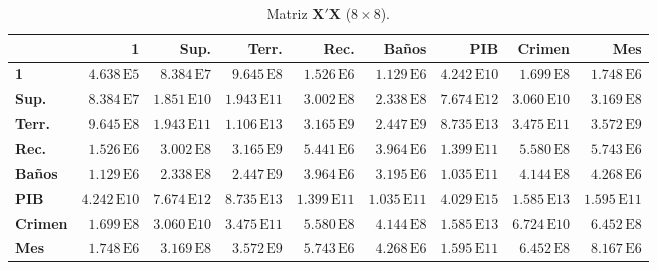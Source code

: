 \documentclass[12pt,letterpaper]{article}
\begin{document}
\begin{table}[H]
\centering
\caption{Matriz $\mathbf{X}'\mathbf{X}$ ($8 \times 8$).}
\scriptsize\setlength{\tabcolsep}{2.5pt}
\begin{tabular}{l*{8}{r}}
\toprule
 & 1 & Sup. & Terr. & Rec. & Baños & PIB & Crimen & Mes \\
\midrule
\textbf{1} & $4.638{\scriptstyle\,\mathrm{E}5}$ & $8.384{\scriptstyle\,\mathrm{E}7}$ & $9.645{\scriptstyle\,\mathrm{E}8}$ & $1.526{\scriptstyle\,\mathrm{E}6}$ & $1.129{\scriptstyle\,\mathrm{E}6}$ & $4.242{\scriptstyle\,\mathrm{E}10}$ & $1.699{\scriptstyle\,\mathrm{E}8}$ & $1.748{\scriptstyle\,\mathrm{E}6}$ \\
\textbf{Sup.} & $8.384{\scriptstyle\,\mathrm{E}7}$ & $1.851{\scriptstyle\,\mathrm{E}10}$ & $1.943{\scriptstyle\,\mathrm{E}11}$ & $3.002{\scriptstyle\,\mathrm{E}8}$ & $2.338{\scriptstyle\,\mathrm{E}8}$ & $7.674{\scriptstyle\,\mathrm{E}12}$ & $3.060{\scriptstyle\,\mathrm{E}10}$ & $3.169{\scriptstyle\,\mathrm{E}8}$ \\
\textbf{Terr.} & $9.645{\scriptstyle\,\mathrm{E}8}$ & $1.943{\scriptstyle\,\mathrm{E}11}$ & $1.106{\scriptstyle\,\mathrm{E}13}$ & $3.165{\scriptstyle\,\mathrm{E}9}$ & $2.447{\scriptstyle\,\mathrm{E}9}$ & $8.735{\scriptstyle\,\mathrm{E}13}$ & $3.475{\scriptstyle\,\mathrm{E}11}$ & $3.572{\scriptstyle\,\mathrm{E}9}$ \\
\textbf{Rec.} & $1.526{\scriptstyle\,\mathrm{E}6}$ & $3.002{\scriptstyle\,\mathrm{E}8}$ & $3.165{\scriptstyle\,\mathrm{E}9}$ & $5.441{\scriptstyle\,\mathrm{E}6}$ & $3.964{\scriptstyle\,\mathrm{E}6}$ & $1.399{\scriptstyle\,\mathrm{E}11}$ & $5.580{\scriptstyle\,\mathrm{E}8}$ & $5.743{\scriptstyle\,\mathrm{E}6}$ \\
\textbf{Baños} & $1.129{\scriptstyle\,\mathrm{E}6}$ & $2.338{\scriptstyle\,\mathrm{E}8}$ & $2.447{\scriptstyle\,\mathrm{E}9}$ & $3.964{\scriptstyle\,\mathrm{E}6}$ & $3.195{\scriptstyle\,\mathrm{E}6}$ & $1.035{\scriptstyle\,\mathrm{E}11}$ & $4.144{\scriptstyle\,\mathrm{E}8}$ & $4.268{\scriptstyle\,\mathrm{E}6}$ \\
\textbf{PIB} & $4.242{\scriptstyle\,\mathrm{E}10}$ & $7.674{\scriptstyle\,\mathrm{E}12}$ & $8.735{\scriptstyle\,\mathrm{E}13}$ & $1.399{\scriptstyle\,\mathrm{E}11}$ & $1.035{\scriptstyle\,\mathrm{E}11}$ & $4.029{\scriptstyle\,\mathrm{E}15}$ & $1.585{\scriptstyle\,\mathrm{E}13}$ & $1.595{\scriptstyle\,\mathrm{E}11}$ \\
\textbf{Crimen} & $1.699{\scriptstyle\,\mathrm{E}8}$ & $3.060{\scriptstyle\,\mathrm{E}10}$ & $3.475{\scriptstyle\,\mathrm{E}11}$ & $5.580{\scriptstyle\,\mathrm{E}8}$ & $4.144{\scriptstyle\,\mathrm{E}8}$ & $1.585{\scriptstyle\,\mathrm{E}13}$ & $6.724{\scriptstyle\,\mathrm{E}10}$ & $6.452{\scriptstyle\,\mathrm{E}8}$ \\
\textbf{Mes} & $1.748{\scriptstyle\,\mathrm{E}6}$ & $3.169{\scriptstyle\,\mathrm{E}8}$ & $3.572{\scriptstyle\,\mathrm{E}9}$ & $5.743{\scriptstyle\,\mathrm{E}6}$ & $4.268{\scriptstyle\,\mathrm{E}6}$ & $1.595{\scriptstyle\,\mathrm{E}11}$ & $6.452{\scriptstyle\,\mathrm{E}8}$ & $8.167{\scriptstyle\,\mathrm{E}6}$ \\
\bottomrule
\end{tabular}
\end{table}
\end{document}
